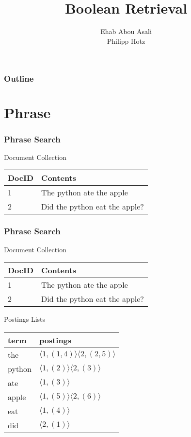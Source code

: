 \documentclass{beamer}
\title{Boolean Retrieval}
\author{Ehab Abou Asali\\ Philipp Hotz}
\begin{document}
\begin{frame}

  \frametitle{Outline}
  \tableofcontents[pausesections]
\end{frame}

\section{Phrase}

\begin{frame}
  \frametitle{Phrase Search}

  \begin{block}{Document Collection}

    \begin{tabular}{ l | l }
      DocID & Contents \\ \hline
      1 & The python ate the apple \\
      2 & Did the python eat the apple? \\
    \end{tabular}

  \end{block}

\end{frame}

\begin{frame}
  \frametitle{Phrase Search}

  \begin{block}{Document Collection}

    \begin{tabular}{ l | l }
      DocID & Contents \\ \hline
      1 & The python ate the apple \\
      2 & Did the python eat the apple? \\
    \end{tabular}

  \end{block}

  \begin{block}{Postings Lists}
    \begin{tabular}{ l | l }
      term & postings \\ \hline
      the & $ \langle 1,(1,4) \rangle \langle 2,(2,5) \rangle $ \\
      python & $ \langle 1,(2) \rangle \langle 2,(3) \rangle $ \\
      ate & $ \langle 1,(3) \rangle $ \\
      apple & $ \langle 1,(5) \rangle \langle 2,(6) \rangle $ \\
      eat & $ \langle 1,(4) \rangle $ \\
      did & $ \langle 2,(1) \rangle $ \\
    \end{tabular}
  \end{block}

\end{frame}
\end{document}
